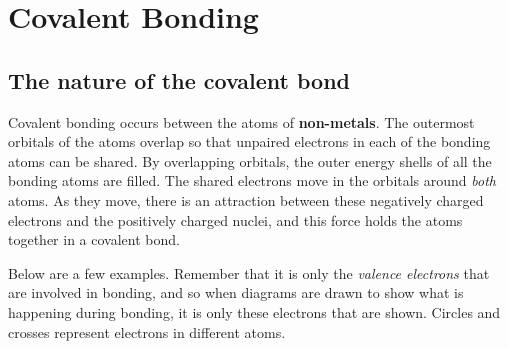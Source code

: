 



\section{Covalent Bonding}
\label{subsec:bonding:covalent}

\subsection{The nature of the covalent bond}

Covalent bonding occurs between the atoms of \textbf{non-metals}. The outermost orbitals of the atoms overlap so that unpaired electrons in each of the bonding atoms can be shared. By overlapping orbitals, the outer energy shells of all the bonding atoms are filled. The shared electrons move in the orbitals around \textit{both} atoms. As they move, there is an attraction between these negatively charged electrons and the positively charged nuclei, and this force holds the atoms together in a covalent bond. 


Below are a few examples. Remember that it is only the \textit{valence electrons} that are involved in bonding, and so when diagrams are drawn to show what is happening during bonding, it is only these electrons that are shown. Circles and crosses represent electrons in different atoms.\\

